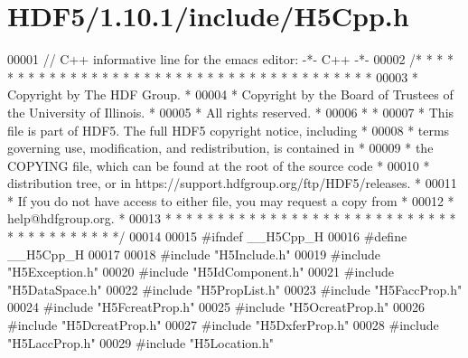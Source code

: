 \hypertarget{_h_d_f5_21_810_81_2include_2_h5_cpp_8h_source}{}\section{H\+D\+F5/1.10.1/include/\+H5\+Cpp.h}
\label{_h_d_f5_21_810_81_2include_2_h5_cpp_8h_source}

\begin{DoxyCode}
00001 \textcolor{comment}{// C++ informative line for the emacs editor: -*- C++ -*-}
00002 \textcolor{comment}{/* * * * * * * * * * * * * * * * * * * * * * * * * * * * * * * * * * * * * * *}
00003 \textcolor{comment}{ * Copyright by The HDF Group.                                               *}
00004 \textcolor{comment}{ * Copyright by the Board of Trustees of the University of Illinois.         *}
00005 \textcolor{comment}{ * All rights reserved.                                                      *}
00006 \textcolor{comment}{ *                                                                           *}
00007 \textcolor{comment}{ * This file is part of HDF5.  The full HDF5 copyright notice, including     *}
00008 \textcolor{comment}{ * terms governing use, modification, and redistribution, is contained in    *}
00009 \textcolor{comment}{ * the COPYING file, which can be found at the root of the source code       *}
00010 \textcolor{comment}{ * distribution tree, or in https://support.hdfgroup.org/ftp/HDF5/releases.  *}
00011 \textcolor{comment}{ * If you do not have access to either file, you may request a copy from     *}
00012 \textcolor{comment}{ * help@hdfgroup.org.                                                        *}
00013 \textcolor{comment}{ * * * * * * * * * * * * * * * * * * * * * * * * * * * * * * * * * * * * * * */}
00014 
00015 \textcolor{preprocessor}{#ifndef \_\_H5Cpp\_H}
00016 \textcolor{preprocessor}{#define \_\_H5Cpp\_H}
00017 
00018 \textcolor{preprocessor}{#include "H5Include.h"}
00019 \textcolor{preprocessor}{#include "H5Exception.h"}
00020 \textcolor{preprocessor}{#include "H5IdComponent.h"}
00021 \textcolor{preprocessor}{#include "H5DataSpace.h"}
00022 \textcolor{preprocessor}{#include "H5PropList.h"}
00023 \textcolor{preprocessor}{#include "H5FaccProp.h"}
00024 \textcolor{preprocessor}{#include "H5FcreatProp.h"}
00025 \textcolor{preprocessor}{#include "H5OcreatProp.h"}
00026 \textcolor{preprocessor}{#include "H5DcreatProp.h"}
00027 \textcolor{preprocessor}{#include "H5DxferProp.h"}
00028 \textcolor{preprocessor}{#include "H5LaccProp.h"}
00029 \textcolor{preprocessor}{#include "H5Location.h"}

\end{DoxyCode}
